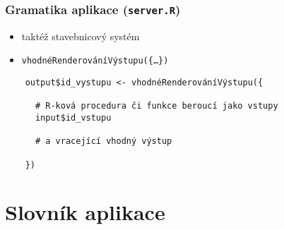 \documentclass[t]{beamer}
\begin{document}

\begin{frame}[fragile]
  \frametitle{Gramatika aplikace (\texttt{server.R})}
  \begin{itemize}
    \item taktéž stavebnicový systém
    \item \texttt{vhodnéRenderováníVýstupu(\{\ldots\})}
  \end{itemize}
  \begin{lstlisting}
    output$id_vystupu <- vhodnéRenderováníVýstupu({
  
      # R-ková procedura či funkce beroucí jako vstupy
      input$id_vstupu
  
      # a vracející vhodný výstup
  
    })
  \end{lstlisting}
\end{frame}



\section{Slovník aplikace}

\end{document}

